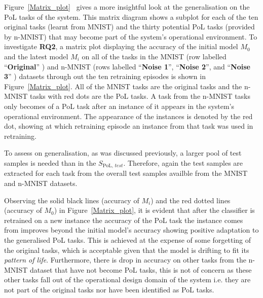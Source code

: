 Figure~\ref{Matrix_plot}~ gives a more insightful look at the generalisation on the PoL tasks of the system. 
%
This matrix diagram shows a subplot for each of the ten  original tasks (learnt from MNIST) and the thirty potential PoL tasks (provided by n-MNIST) that may become part of the system's operational environment.  
%
To investigate \textbf{RQ2}, a matrix plot displaying the accuracy of the initial model $M_0$ and the latest model $M_i$ on all of the tasks in the MNIST (row labelled ``\textbf{Original}'' ) and n-MNIST (rows labelled ``\textbf{Noise 1}'', ``\textbf{Noise 2}'', and ``\textbf{Noise 3}'' ) datasets through out the ten retraining episodes is shown in Figure~\ref{Matrix_plot}.  
%
All of the MNIST tasks are the original tasks and the n-MNIST tasks with red dots are the PoL tasks. 
A task from the n-MNIST tasks
only becomes of a PoL task after an instance of it appears in the system's operational environment. 
%
%
The appearance of the instances is denoted by the red dot, showing at which retraining episode an instance from that task was used in retraining.

To assess on generalisation, as was discussed previously, a larger pool of test samples is needed than in the $S_{\text{PoL, }test}$.
%
Therefore, again the test samples are extracted for each task from the overall test samples availble from the MNIST and n-MNIST datasets.
%
%

Observing the solid black lines (accuracy of $M_i$) and the red dotted lines (accuracy of $M_0$) in Figure~\ref{Matrix_plot}, it is evident that after the classifier is retrained on a new instance the accuracy of the PoL task the instance comes from improves beyond the initial model's accuracy showing positive adaptation to the generalised PoL tasks.  
% 
This is achieved at the expense of some forgetting of the original tasks, which is acceptable given that the model is drifting to fit its \textit{pattern of life}.    
%
Furthermore, there is drop in accuracy on other tasks from the n-MNIST dataset that have not become PoL tasks, this is not of concern as these other tasks fall out of the operational design domain of the system i.e. they are not part of the original tasks nor have been identified as PoL tasks.

